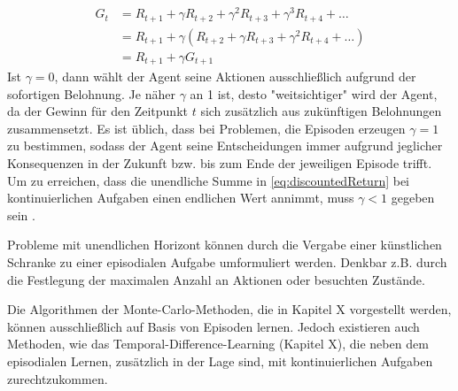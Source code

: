 \begin{equation}\label{eq:successiveReturn}
    \begin{aligned}
    G_t &= R_{t+1} + \gamma R_{t+2} + \gamma^2 R_{t+3} + \gamma^3 R_{t+4} + \dots \\
    &= R_{t+1} + \gamma (R_{t+2} + \gamma R_{t+3} + \gamma^2 R_{t+4} + \dots)  \\
   & = R_{t+1} + \gamma G_{t+1}
    \end{aligned}
\end{equation}
Ist $\gamma = 0$, dann wählt der Agent seine Aktionen ausschließlich aufgrund der sofortigen Belohnung. Je näher $\gamma$ an 1 ist, desto "weitsichtiger" wird der Agent, da der Gewinn für den Zeitpunkt $t$ sich zusätzlich aus zukünftigen Belohnungen zusammensetzt. Es ist üblich, dass bei Problemen, die Episoden erzeugen $\gamma = 1$ zu bestimmen, sodass der Agent seine Entscheidungen immer aufgrund jeglicher Konsequenzen in der Zukunft bzw. bis zum Ende der jeweiligen Episode trifft. Um zu erreichen, dass die unendliche Summe in \eqref{eq:discountedReturn} bei kontinuierlichen Aufgaben einen endlichen Wert annimmt, muss $\gamma < 1$ gegeben sein \cite[S.55]{Sutton1998}. 
\par 
Probleme mit unendlichen Horizont können durch die Vergabe einer künstlichen Schranke zu einer episodialen Aufgabe umformuliert werden. Denkbar z.B. durch die Festlegung der maximalen Anzahl an Aktionen oder besuchten Zustände. 
\par 
Die Algorithmen der Monte-Carlo-Methoden, die in Kapitel X vorgestellt werden, können ausschließlich auf Basis von Episoden lernen. Jedoch existieren auch Methoden, wie das Temporal-Difference-Learning (Kapitel X), die neben dem episodialen Lernen, zusätzlich in der Lage sind, mit kontinuierlichen Aufgaben zurechtzukommen. 